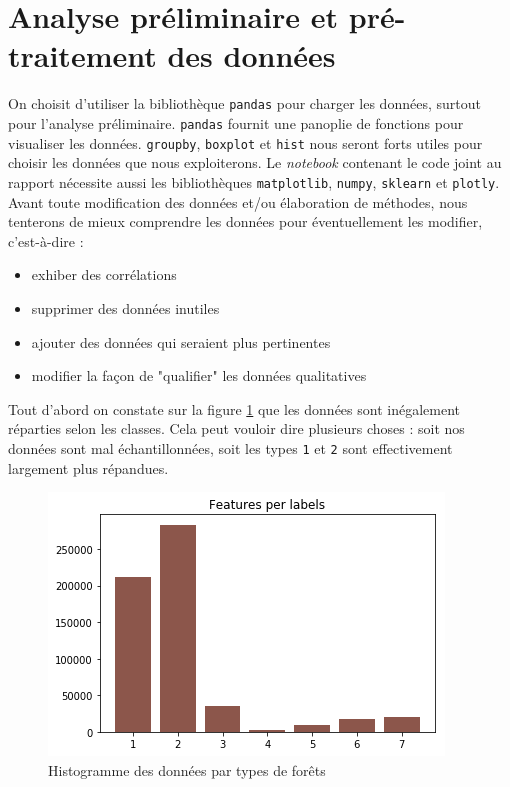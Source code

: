 \documentclass[12pt,a4paper]{article}
\numberwithin{equation}{section}
\begin{document}
	\tableofcontents
	
	\newpage
	
	\section{Analyse préliminaire et pré-traitement des données}
	
	On choisit d'utiliser la bibliothèque \verb!pandas! pour charger les données, surtout pour l'analyse préliminaire. \verb!pandas! fournit une panoplie de fonctions pour visualiser les données. \verb!groupby!, \verb!boxplot! et \verb!hist! nous seront forts utiles pour choisir les données que nous exploiterons. Le \textit{notebook} contenant le code joint au rapport nécessite aussi les bibliothèques \verb!matplotlib!, \verb!numpy!, \verb!sklearn! et \verb!plotly!.\\
	
	Avant toute modification des données et/ou élaboration de méthodes, nous tenterons de mieux comprendre les données pour éventuellement les modifier, c'est-à-dire :\\
	
	\begin{itemize}
		\item exhiber des corrélations
		\item supprimer des données inutiles
		\item ajouter des données qui seraient plus pertinentes
		\item modifier la façon de "qualifier" les données qualitatives
	\end{itemize}
	
	\medskip
	
	Tout d'abord on constate sur la figure \ref{fig:datahist} que les données sont inégalement réparties selon les classes. Cela peut vouloir dire plusieurs choses : soit nos données sont mal échantillonnées, soit les types \verb!1! et \verb!2! sont effectivement largement plus répandues.\\
	
	\begin{figure}
		\centering
		\includegraphics[width=.7\linewidth]{img/data_hist}
		\caption{Histogramme des données par types de forêts}
		\label{fig:datahist}
	\end{figure}
	
\end{document}
